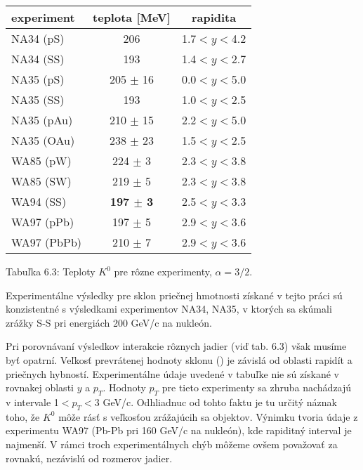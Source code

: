 \begin{center}
\begin{tabular}{|l|c|c|}
\hline
experiment & teplota [MeV] & rapidita \\ \hline \hline
NA34 (pS) & 206 & 1.7$<y<$4.2 \\
NA34 (SS) & 193 & 1.4$<y<$2.7 \\
NA35 (pS) & 205 $\pm$ 16 & 0.0$<y<$5.0 \\
NA35 (SS) & 193 & 1.0$<y<$2.5 \\
NA35 (pAu) & 210 $\pm$ 15 & 2.2$<y<$5.0 \\
NA35 (OAu) & 238 $\pm$ 23 & 1.5$<y<$2.5 \\
WA85 (pW) & 224 $\pm$ 3 & 2.3$<y<$3.8 \\
WA85 (SW) & 219 $\pm$ 5 & 2.3$<y<$3.8 \\
WA94 (SS) & {\bf 197 $\pm$ 3} & 2.5$<y<$3.3 \\
WA97 (pPb) & 197 $\pm$ 5 & 2.9$<y<$3.6 \\
WA97 (PbPb) & 210 $\pm$ 7 & 2.9$<y<$3.6 \\  
\hline  
\end{tabular}
\end{center}

\begin{center}
  Tabuľka 6.3: Teploty $K^{0}$ pre rôzne experimenty, $\alpha=3/2$.
\end{center}

Experimentálne výsledky pre sklon priečnej hmotnosti získané v tejto práci
sú konzistentné s výsledkami  experimentov NA34, NA35, v ktorých sa skúmali
zrážky S-S pri energiách 200 GeV/c na nukleón.

Pri porovnávaní výsledkov interakcie rôznych jadier (viď tab. 6.3)  však
musíme byť opatrní. Veľkosť  prevrátenej hodnoty sklonu () je 
závislá od oblasti rapidít a priečnych hybností. Experimentálne údaje 
uvedené v tabuľke nie sú získané v rovnakej oblasti $y$ a $p_{T}$.
Hodnoty $p_{T}$ pre tieto experimenty sa zhruba nachádzajú v intervale
1$<p_{T}<$3 GeV/c. Odhliadnuc od tohto faktu je tu určitý náznak toho, že
 $K^{0}$ môže rásť s veľkosťou zrážajúcih sa objektov. Výnimku
tvoria údaje z experimentu WA97 (Pb-Pb pri 160 GeV/c na nukleón), kde 
rapiditný interval je najmenší. V rámci troch experimentálnych chýb môžeme
ovšem   považovať za rovnakú, nezávislú od rozmerov jadier. 
% 

